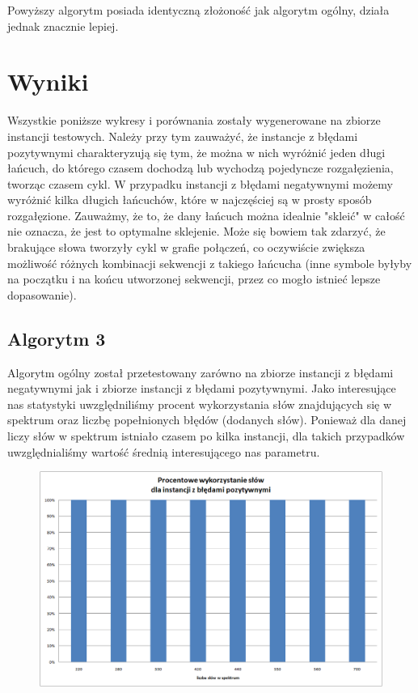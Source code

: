 \documentclass[a4paper,10pt]{article}
\begin{document}
Powyższy algorytm posiada identyczną złożoność jak algorytm ogólny, działa jednak znacznie lepiej.

\section{Wyniki}

Wszystkie poniższe wykresy i porównania zostały wygenerowane na zbiorze instancji testowych. Należy przy tym zauważyć, że instancje z błędami pozytywnymi charakteryzują się tym, że można w nich wyróżnić jeden długi łańcuch, do którego czasem dochodzą lub wychodzą pojedyncze rozgałęzienia, tworząc czasem cykl. W przypadku instancji z błędami negatywnymi możemy wyróżnić kilka długich łańcuchów, które w najczęściej są w prosty sposób rozgałęzione. Zauważmy, że to, że dany łańcuch można idealnie "skleić" w całość nie oznacza, że jest to optymalne sklejenie. Może się bowiem tak zdarzyć, że brakujące słowa tworzyły cykl w grafie połączeń, co oczywiście zwiększa możliwość różnych kombinacji sekwencji z takiego łańcucha (inne symbole byłyby na początku i na końcu utworzonej sekwencji, przez co mogło istnieć lepsze dopasowanie).

\subsection{Algorytm 3}

Algorytm ogólny został przetestowany zarówno na zbiorze instancji z błędami negatywnymi jak i zbiorze instancji z błędami pozytywnymi. Jako interesujące nas statystyki uwzględniliśmy procent wykorzystania słów znajdujących się w spektrum oraz liczbę popełnionych błędów (dodanych słów). Ponieważ dla danej liczy słów w spektrum istniało czasem po kilka instancji, dla takich przypadków uwzględnialiśmy wartość średnią interesującego nas parametru.

\begin{figure}[h]
  \footnotesize\centering
  \includegraphics[width=\textwidth,keepaspectratio]{percentageUsedWords_general_positive.png}
\end{figure}
\end{document}
